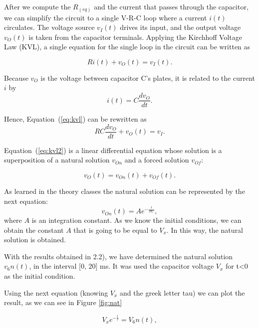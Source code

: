 After we compute the $R_(eq)$ and the current that passes through the capacitor, we can simplify the circuit to a  single V-R-C loop where a current $i(t)$ circulates. The
voltage source $v_I(t)$ drives its input, and the output voltage $v_O(t)$ is taken from
the capacitor terminals. Applying the Kirchhoff Voltage Law (KVL), a single
equation for the single loop in the circuit can be written as

\begin{equation}
  Ri(t) + v_O(t) = v_I(t).
  \label{eq:kvl}
\end{equation}

Because $v_O$ is the voltage between capacitor C's plates, it is related to the
current $i$ by
\begin{equation}
  i(t) = C\frac{dv_O}{dt}.
\end{equation}

Hence, Equation~(\ref{eq:kvl}) can be rewritten as
\begin{equation}
  RC\frac{dv_O}{dt} + v_O(t) = v_I.
  \label{eq:kvl2}
\end{equation}

Equation~(\ref{eq:kvl2}) is a linear differential equation whose solution is a
superposition of a natural solution $v_{On}$ and a forced solution $v_{Of}$:

\begin{equation}
  v_O(t) = v_{On}(t) + v_{Of}(t).
  \label{eq:vo_sol}
\end{equation}

As learned in the theory classes the natural solution can be represented by the next equation:
\begin{equation}
  v_{On}(t) = Ae^{-\frac{t}{RC}},
  \label{eq:vo_nat}
\end{equation}
where $A$ is an integration constant.
As we know the initial conditions, we can obtain the constant $A$ that is going to be equal to $V_x$. In this way, the natural solution is obtained.


With the results obtained in 2.2),  we have determined the natural solution $v_6n(t)$, in the interval [0, 20] ms. It was used the capacitor voltage $V_x$ for t\textless0 as the initial condition.

Using the next equation (knowing $V_x$ and the greek letter tau) we can plot the result, as we can see in Figure \ref{fig:nat}

\begin{equation}
  V_xe^{-\frac{t}{{\displaystyle \tau }}}=V_6n(t),
  \label{eq:vo_nat}
\end{equation}

